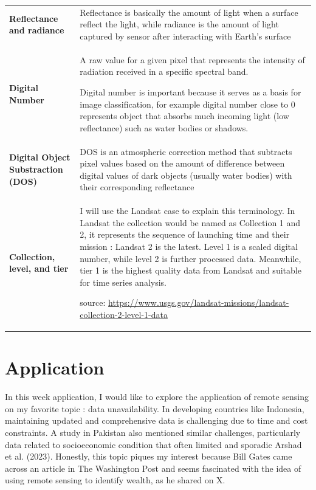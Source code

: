\documentclass[
  letterpaper,
  DIV=11,
  numbers=noendperiod]{scrreprt}
\begin{document}
\begin{longtable}[]{@{}
  >{\raggedright\arraybackslash}p{}
  >{\raggedright\arraybackslash}p{}@{}}
\toprule\noalign{}
\endhead
\bottomrule\noalign{}
\endlastfoot
\textbf{Reflectance and radiance} & Reflectance is basically the amount
of light when a surface reflect the light, while radiance is the amount
of light captured by sensor after interacting with Earth's surface \\
\textbf{Digital Number} & A raw value for a given pixel that represents
the intensity of radiation received in a specific spectral band.

Digital number is important because it serves as a basis for image
classification, for example digital number close to 0 represents object
that absorbs much incoming light (low reflectance) such as water bodies
or shadows. \\
\textbf{Digital Object Substraction (DOS)} & DOS is an atmospheric
correction method that subtracts pixel values based on the amount of
difference between digital values of dark objects (usually water bodies)
with their corresponding reflectance \\
\textbf{Collection, level, and tier} & I will use the Landsat case to
explain this terminology. In Landsat the collection would be named as
Collection 1 and 2, it represents the sequence of launching time and
their mission : Landsat 2 is the latest. Level 1 is a scaled digital
number, while level 2 is further processed data. Meanwhile, tier 1 is
the highest quality data from Landsat and suitable for time series
analysis.

source:
\url{https://www.usgs.gov/landsat-missions/landsat-collection-2-level-1-data} \\
\end{longtable}

\hypertarget{application-1}{%
\section{Application}\label{application-1}}

In this week application, I would like to explore the application of
remote sensing on my favorite topic : data unavailability. In developing
countries like Indonesia, maintaining updated and comprehensive data is
challenging due to time and cost constraints. A study in Pakistan also
mentioned similar challenges, particularly data related to socioeconomic
condition that often limited and sporadic Arshad et al. (2023).
Honestly, this topic piques my interest because Bill Gates came across
an article in The Washington Post and seems fascinated with the idea of
using remote sensing to identify wealth, as he shared on X.
\end{document}

